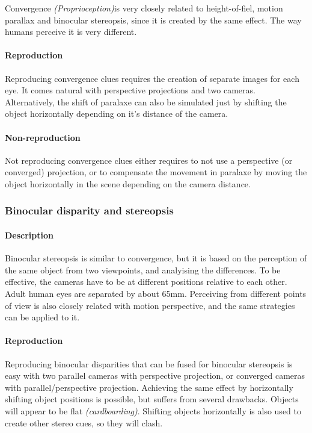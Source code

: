 Convergence \textit{(Proprioception)}is very closely related to height-of-fiel, motion parallax and binocular stereopsis, since it is created by the same effect. The way humans perceive it is very different.

\paragraph{Reproduction}
Reproducing convergence clues requires the creation of separate images for each eye. It comes natural with perspective projections and two cameras. Alternatively, the shift of paralaxe can also be simulated just by shifting the object horizontally depending on it's distance of the camera.

\paragraph{Non-reproduction}
Not reproducing convergence clues either requires to not use a perspective (or converged) projection, or to compensate the movement in paralaxe by moving the object horizontally in the scene depending on the camera distance.


\subsubsection{Binocular disparity and stereopsis}
\paragraph{Description}
Binocular stereopsis is similar to convergence, but it is based on the perception of the same object from two viewpoints, and analyising the differences. To be effective, the cameras have to be at different positions relative to each other. Adult human eyes are separated by about 65mm. Perceiving from different points of view is also closely related with motion perspective, and the same strategies can be applied to it.

\paragraph{Reproduction}
Reproducing binocular disparities that can be fused for binocular stereopsis is easy with two parallel cameras with perspective projection, or converged cameras with parallel/perspective projection.
Achieving the same effect by horizontally shifting object positions is possible, but suffers from several drawbacks. Objects will appear to be flat \textit{(cardboarding)}. Shifting objects horizontally is also used to create other stereo cues, so they will clash.

